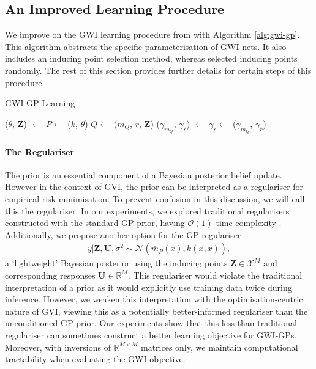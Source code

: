 \documentclass{article}
\numberwithin{equation}{section}
\begin{document}
\subsection{An Improved Learning Procedure}
We improve on the GWI learning procedure from \cite{wild2022generalized} with Algorithm \ref{alg:gwi-gp}.
This algorithm abstracts the specific parameterisation of GWI-nets. 
It also includes an inducing point selection method, whereas \cite{wild2022generalized} selected inducing points randomly.
The rest of this section provides further details for certain steps of this procedure.
\begin{algorithm}[h!]
\caption{GWI-GP Learning}\label{alg:gwi-gp}
\begin{algorithmic}
     
    \State ($\theta$, $\mathbf{Z}$) $\leftarrow$  
    \State $P \leftarrow$ ($k$, $\theta$) 
    \State $Q \leftarrow$ ($m_Q$, $r$, $\mathbf{Z}$) 
    \State ($\gamma_{m_Q}$, $\gamma_r$) $\leftarrow$  
    \State $\gamma_r \leftarrow$  
    \State \Return ($\gamma_{m_Q}$, $\gamma_r$)
\end{algorithmic}
\end{algorithm}
\paragraph{The Regulariser} The prior is an essential component of a Bayesian posterior belief update.
However in the context of GVI, the prior can be interpreted as a regulariser for empirical risk minimisation.
To prevent confusion in this discussion, we will call this the regulariser. 
In our experiments, we explored traditional regularisers constructed with the standard GP prior, having $\mathcal{O}(1)$ time complexity . 
Additionally, we propose another option for the GP regulariser
\begin{align}
    y \vert \mathbf{Z}, \mathbf{U}, \sigma^2
    \sim \mathcal{N}\left(\bar{m}_P(x), \bar{k}(x, x)\right),
    \label{gp-posterior-regulariser}
\end{align}
a `lightweight' Bayesian posterior using the inducing points $\mathbf{Z}\in \mathcal{X}^M$ and corresponding responses $\mathbf{U} \in \mathbb{R}^M$.
This regulariser would violate the traditional interpretation of a prior as it would explicitly use training data twice during inference.
However, we weaken this interpretation with the optimisation-centric nature of GVI, viewing this as a potentially better-informed regulariser than the unconditioned GP prior.
Our experiments show that this less-than traditional regulariser can sometimes construct a better learning objective for GWI-GPs.
Moreover, with inversions of $\mathbb{R}^{M\times M}$ matrices only, we maintain computational tractability when evaluating the GWI objective.
\newpage
\end{document}
